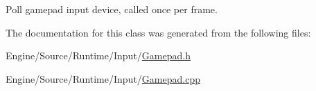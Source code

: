 Poll gamepad input device, called once per frame. 

The documentation for this class was generated from the following files\+:\begin{DoxyCompactItemize}
\item 
Engine/\+Source/\+Runtime/\+Input/\mbox{\hyperlink{_gamepad_8h}{Gamepad.\+h}}\item 
Engine/\+Source/\+Runtime/\+Input/\mbox{\hyperlink{_gamepad_8cpp}{Gamepad.\+cpp}}\end{DoxyCompactItemize}
